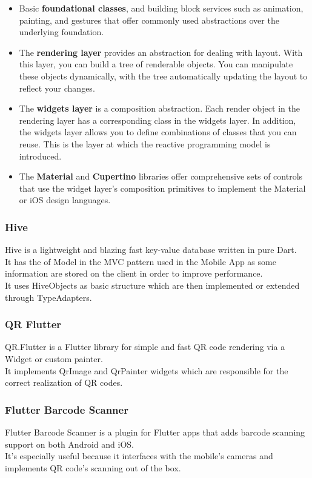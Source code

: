 \documentclass[table, 12pt]{article}
\begin{document}
\begin{itemize}
    \item Basic \textbf{foundational classes}, and building block services such as animation, painting, and gestures that offer commonly used abstractions over the underlying foundation.
    \item The \textbf{rendering layer} provides an abstraction for dealing with layout. With this layer, you can build a tree of renderable objects. You can manipulate these objects dynamically, with the tree automatically updating the layout to reflect your changes.
    \item The \textbf{widgets layer} is a composition abstraction. Each render object in the rendering layer has a corresponding class in the widgets layer. In addition, the widgets layer allows you to define combinations of classes that you can reuse. This is the layer at which the reactive programming model is introduced.
    \item The \textbf{Material} and \textbf{Cupertino} libraries offer comprehensive sets of controls that use the widget layer’s composition primitives to implement the Material or iOS design languages.
\end{itemize}
\subsubsection{Hive}
Hive is a lightweight and blazing fast key-value database written in pure Dart.\\
It has the of Model in the MVC pattern used in the Mobile App as some information are stored on the client in order to improve performance.\\
It uses HiveObjects as basic structure which are then implemented or extended through TypeAdapters.
\subsubsection{QR Flutter}
QR.Flutter is a Flutter library for simple and fast QR code rendering via a Widget or custom painter.\\
It implements QrImage and QrPainter widgets which are responsible for the correct realization of QR codes.
\subsubsection{Flutter Barcode Scanner}
Flutter Barcode Scanner is a plugin for Flutter apps that adds barcode scanning support on both Android and iOS.\\
It's especially useful because it interfaces with the mobile's cameras and implements QR code's scanning out of the box.
\end{document}
